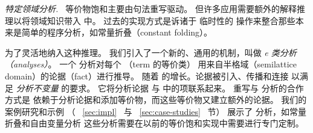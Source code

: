 \textit{特定领域分析. $\,$}
等价物饱和主要由句法重写驱动。
  但许多应用需要额外的解释推理以将领域知识带入 \egraph 中。
过去的实现方式是诉诸于
  临时性的 \egraph 操作来整合那些本来是简单的程序分析，如常量折叠（constant folding）。

为了灵活地纳入这种推理。
  我们引入了一个新的、通用的机制，叫做 \textit{e 类分析（\eclass analyses）}。
一个 \eclass 分析对每个 \eclass （term 的等价类）
  用来自半格域（semilattice domain）的论据（fact）进行推导。
随着 \egraphs 的增长。论据被引入、传播和连接 
  以满足 \textit{\eclass 分析不变量} 的要求。
  它将分析论据 与 \egraph 中的项联系起来。
重写与 \eclass 分析的合作方式是
  依赖于分析论据和添加等价物，而这些等价物又建立额外的论据。
我们的案例研究和示例 （ ~\ref{sec:impl} ~与~ \ref{sec:case-studies}~ 节）
  展示了 \eclass 分析，如常量折叠和自由变量分析
  这些分析需要在以前的等价饱和实现中需要进行专门定制。


